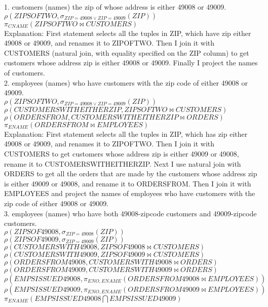 \documentclass[12pt,a4paper]{amsart}
\begin{document}
1. customers (names) the zip of whose address is either 49008 or 49009. \\
$\rho (ZIPSOFTWO, \sigma_{ZIP=49008 \vee ZIP=49009}(ZIP))$ \\
$\pi_{CNAME}(ZIPSOFTWO \Join CUSTOMERS)$ \\

Explanation: First statement selects all the tuples in ZIP, which have zip either 49008 or 49009, and renames it to ZIPOFTWO. Then I join it with CUSTOMERS (natural join, with equality specified on the ZIP column) to get customers whose address zip is either 49008 or 49009. Finally I project the names of customers. \\

2. employees (names) who have customers with the zip code of either  49008 or 49009. \\
$\rho (ZIPSOFTWO, \sigma_{ZIP=49008 \vee ZIP=49009}(ZIP))$ \\
$\rho (CUSTOMERSWITHEITHERZIP, ZIPSOFTWO \Join CUSTOMERS) $ \\
$\rho (ORDERSFROM, CUSTOMERSWITHEITHERZIP \Join ORDERS)$ \\
$\pi_{ENAME}(ORDERSFROM \Join EMPLOYEES)$ \\

Explanation: First statement selects all the tuples in ZIP, which has zip either 49008 or 49009, and renames it to ZIPOFTWO. Then I join it with CUSTOMERS to get customers whose address zip is either 49009 or 49008, rename it to CUSTOMERSWITHEITHERZIP. Next I use natural join with ORDERS to get all the orders that are made by the customers whose address zip is either 49009 or 49008, and rename it to ORDERSFROM. Then I join it with EMPLOYEES and project the names of employees who have customers with the zip code of either 49008 or 49009. \\

3. employees (names) who have both 49008-zipcode customers and 49009-zipcode customers. \\
$\rho (ZIPSOF49008, \sigma_{ZIP=49008}(ZIP))$ \\
$\rho (ZIPSOF49009, \sigma_{ZIP=49009}(ZIP))$ \\
$\rho (CUSTOMERSWITH49008, ZIPSOF49008 \Join CUSTOMERS)$ \\
$\rho (CUSTOMERSWITH49009, ZIPSOF49009 \Join CUSTOMERS)$ \\
$\rho (ORDERSFROM49008, CUSTOMERSWITH49008 \Join ORDERS) $ \\
$\rho (ORDERSFROM49009, CUSTOMERSWITH49009 \Join ORDERS) $ \\
$\rho (EMPSISSUED49008, \pi_{ENO, ENAME} (ORDERSFROM49008 \Join EMPLOYEES))$ \\
$\rho (EMPSISSUED49009, \pi_{ENO, ENAME} (ORDERSFROM49009 \Join EMPLOYEES))$ \\
$\pi_{ENAME} (EMPSISSUED49008 \bigcap EMPSISSUED49009) $ \\
\end{document}
